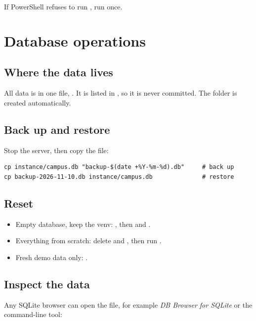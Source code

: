 \documentclass[11pt,a4paper]{article}
\begin{document}
If PowerShell refuses to run , run
 once.

\section{Database operations}

\subsection{Where the data lives}

All data is in one file, . It is listed in , so it is never
committed. The  folder is created automatically.

\subsection{Back up and restore}
\label{sec:backup}

Stop the server, then copy the file:

\begin{lstlisting}[style=shell]
cp instance/campus.db "backup-$(date +%Y-%m-%d).db"     # back up
cp backup-2026-11-10.db instance/campus.db              # restore
\end{lstlisting}

\subsection{Reset}

\begin{itemize}
  \item Empty database, keep the venv: , then
         and .
  \item Everything from scratch: delete  and , then run
        .
  \item Fresh demo data only: .
\end{itemize}

\subsection{Inspect the data}

Any SQLite browser can open the file, for example \emph{DB Browser for SQLite} or the
 command-line tool:
\end{document}
